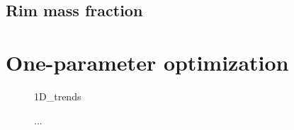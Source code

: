 \documentclass[\rootdir/thesis.tex]{subfiles}
\begin{document}
\subsection{Rim mass fraction}


\section{One-parameter optimization}

\begin{figure}
\centering
{1D_trends}
\caption{...}
\label{fig:opt_1D_trends}
\end{figure}

\inprogress
\end{document}
